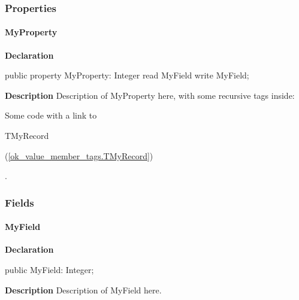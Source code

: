 \documentclass{report}
\begin{document}
  \subsubsection*{\large{\textbf{Properties}}\normalsize\hspace{1ex}\hfill}
\paragraph*{MyProperty}\hspace*{\fill}

\begin{list}{}{
\setlength{\itemindent}{0cm}
\setlength{\listparindent}{0cm}
\setlength{\leftmargin}{\evensidemargin}
\addtolength{\leftmargin}{\tmplength}
\settowidth{\labelsep}{X}
\addtolength{\leftmargin}{\labelsep}
\setlength{\labelwidth}{\tmplength}
}
\begin{flushleft}
\item[\textbf{Declaration}\hfill]
\begin{ttfamily}
public property MyProperty: Integer read MyField write MyField;\end{ttfamily}


\end{flushleft}
\par
\item[\textbf{Description}]
Description of MyProperty here, with some recursive tags inside: \begin{ttfamily}Some code with a link to \begin{ttfamily}TMyRecord\end{ttfamily}(\ref{ok_value_member_tags.TMyRecord})\end{ttfamily}.

\end{list}
\subsubsection*{\large{\textbf{Fields}}\normalsize\hspace{1ex}\hfill}
\paragraph*{MyField}\hspace*{\fill}

\begin{list}{}{
\setlength{\itemindent}{0cm}
\setlength{\listparindent}{0cm}
\setlength{\leftmargin}{\evensidemargin}
\addtolength{\leftmargin}{\tmplength}
\settowidth{\labelsep}{X}
\addtolength{\leftmargin}{\labelsep}
\setlength{\labelwidth}{\tmplength}
}
\begin{flushleft}
\item[\textbf{Declaration}\hfill]
\begin{ttfamily}
public MyField: Integer;\end{ttfamily}


\end{flushleft}
\par
\item[\textbf{Description}]
Description of MyField here.

\end{list}
\end{document}
